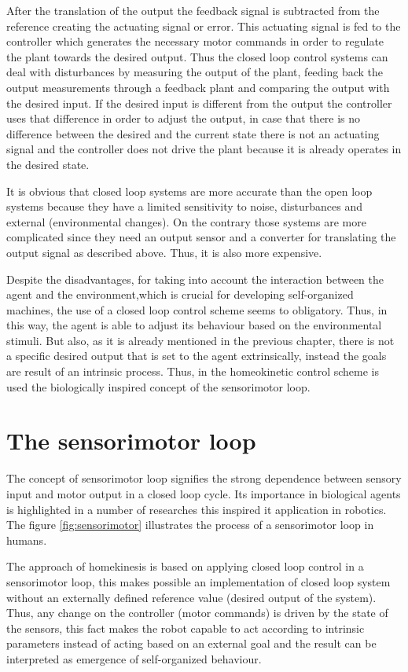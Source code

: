 \documentclass[msc,ai,logo]{infthesis}
\begin{document}
After the translation of the output the feedback signal is subtracted from the reference creating the actuating signal or error. This actuating signal is fed to the controller which generates the necessary motor commands in order to regulate the plant towards the desired output. Thus the closed loop control systems can deal with disturbances by measuring the output of the plant, feeding back the output measurements through a feedback plant and comparing the output with the desired input. If the desired input is different from the output the controller uses that difference in order to adjust the output, in case that there is no difference between the desired and the current state there is not an actuating signal and the controller does not drive the plant because it is already operates in the desired state.

It is obvious that closed loop systems are more accurate than the open loop systems because they have a limited sensitivity to noise, disturbances and external (environmental changes). On the contrary those systems are more complicated since they need an output sensor and a converter for translating the output signal as described above. Thus, it is also more expensive.

Despite the disadvantages, for taking into account the interaction between the agent and the environment,which is crucial for developing self-organized machines, the use of a closed loop control scheme seems to obligatory.  
Thus, in this way, the agent is able to adjust its behaviour based on the environmental stimuli. But also, as it is already mentioned in the previous chapter, there is not a specific desired output that is set to the agent extrinsically, instead the goals are result of an intrinsic process. Thus, in the homeokinetic control scheme is used the biologically inspired concept of the sensorimotor loop.

\section{The sensorimotor loop}   

The concept of sensorimotor loop signifies the strong dependence between sensory input and motor output in a closed loop cycle. Its importance in biological agents is highlighted in a number of researches \citep{wiener,Ferezou,Nguyen} this inspired it application in robotics. The figure \ref{fig:sensorimotor} illustrates the process of a sensorimotor loop in humans.

The approach of homekinesis is based on applying  closed loop control in a sensorimotor loop, this makes possible an implementation of closed loop system without an externally defined reference value (desired output of the system). Thus, any change on the controller (motor commands) is driven by the state of the sensors, this fact makes the robot capable to act according to intrinsic parameters instead of acting based on an external goal and the result can be interpreted as emergence of self-organized behaviour. 
\end{document}

